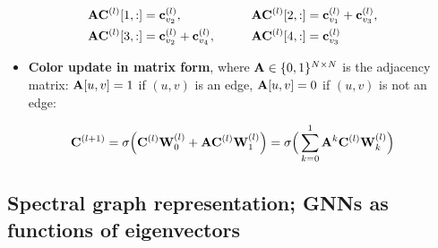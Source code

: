 \begin{equation}\label{eq:lec07-ACrows}
  \begin{aligned}
    \mathbf{A}\mathbf{C}^{(l)}[1,:]&=\mathbf{c}_{v_2}^{(l)}, &\qquad
    \mathbf{A}\mathbf{C}^{(l)}[2,:]&=\mathbf{c}_{v_1}^{(l)}+\mathbf{c}_{v_3}^{(l)},\\
    \mathbf{A}\mathbf{C}^{(l)}[3,:]&=\mathbf{c}_{v_2}^{(l)}+\mathbf{c}_{v_4}^{(l)}, &\qquad
    \mathbf{A}\mathbf{C}^{(l)}[4,:]&=\mathbf{c}_{v_3}^{(l)}
  \end{aligned}
\end{equation}
\begin{itemize}
  \item \textbf{Color update in matrix form}, where $\mathbf{A}\in\{0,1\}^{N\times N}$ is
    the adjacency matrix: $\mathbf{A}[u,v]=1$ if $(u,v)$ is an edge, $\mathbf{A}[u,v]=0$ if
    $(u,v)$ is not an edge:
\end{itemize}
\begin{equation}\label{eq:lec07-ginmat}
  \mathbf{C}^{(l+1)} = \sigma\Big(\mathbf{C}^{(l)}\mathbf{W}_0^{(l)} + \mathbf{A}\mathbf{C}^{(l)}\mathbf{W}_1^{(l)}\Big)
  = \sigma\Big(\sum_{k=0}^{1}\mathbf{A}^k\mathbf{C}^{(l)}\mathbf{W}_k^{(l)}\Big)
\end{equation}

\subsection{Spectral graph representation; GNNs as functions of eigenvectors}\label{sec:lec07-eig}

